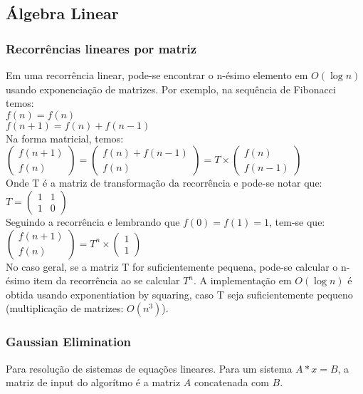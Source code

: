 
\subsection{Álgebra Linear}

\subsubsection{Recorrências lineares por matriz}
Em uma recorrência linear, pode-se encontrar o n-ésimo elemento em $O(\log{n})$ usando exponenciação de matrizes. Por exemplo, na sequência de Fibonacci temos:
\\ $f(n) = f(n)$
\\ $f(n+1) = f(n)+f(n-1)$
\\Na forma matricial, temos:
\\
$\left( \begin{array}{c}
f(n+1) \\
f(n) \end{array} \right)
 = 
\left( \begin{array}{c}
f(n) + f(n-1) \\
f(n) \end{array} \right)
 = T \times
\left( \begin{array}{c}
f(n) \\
f(n-1) \end{array} \right)$
\\ Onde T é a matriz de transformação da recorrência e pode-se notar que:
$T=\left( \begin{array}{cc}
1 & 1 \\
1 & 0 \end{array} \right)$
\\ Seguindo a recorrência e lembrando que $f(0) = f(1) = 1$, tem-se que:
\\$\left( \begin{array}{c}
f(n+1) \\
f(n) \end{array} \right) = T^n \times
\left( \begin{array}{c}
1 \\
1 \end{array} \right)$
\\ No caso geral, se a matriz T for suficientemente pequena, pode-se calcular o n-ésimo item da recorrência ao se calcular $T^n$. A implementação em $O(\log{n})$ é obtida usando exponentiation by squaring, caso T seja suficientemente pequeno (multiplica\c{c}\~{a}o de matrizes: $O(n^3)$).

\divisor
\subsubsection{Gaussian Elimination}
Para resolu\c{c}\~{a}o de sistemas de equa\c{c}\~{o}es lineares. Para um sistema $A*x = B$, a matriz de input do algor\'{i}tmo \'{e} a matriz $A$ concatenada com $B$.

\divisor
